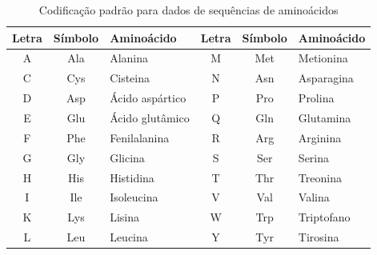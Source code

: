 \documentclass[english,brazilian]{UNISINOSmonografia} %
\newcommand\defaultFigureWidth{0.9}
\begin{document}
\begin{table}[tb]
\centering%
\begin{minipage}{\defaultFigureWidth\textwidth}
	\caption{Codificação padrão para dados de sequências de aminoácidos}
	\label{tab:amino-codes}
	\setlength{\tabcolsep}{9pt}
	\vspace{1ex}
	\begin{tabularx}{\textwidth}{ccX|ccX}
		\toprule
		Letra & Símbolo & Aminoácido            & Letra & Símbolo & Aminoácido       \\
		\midrule
		A          & Ala     & Alanina         & M          & Met     & Metionina  \\
		C          & Cys     & Cisteina        & N          & Asn     & Asparagina \\
		D          & Asp     & Ácido aspártico & P          & Pro     & Prolina    \\
		E          & Glu     & Ácido glutâmico & Q          & Gln     & Glutamina  \\
		F          & Phe     & Fenilalanina    & R          & Arg     & Arginina   \\
		G          & Gly     & Glicina         & S          & Ser     & Serina     \\
		H          & His     & Histidina       & T          & Thr     & Treonina   \\
		I          & Ile     & Isoleucina      & V          & Val     & Valina     \\
		K          & Lys     & Lisina          & W          & Trp     & Triptofano \\
		L          & Leu     & Leucina         & Y          & Tyr     & Tirosina   \\
		\bottomrule
	\end{tabularx}
\end{minipage}
\end{table}
\end{document}
